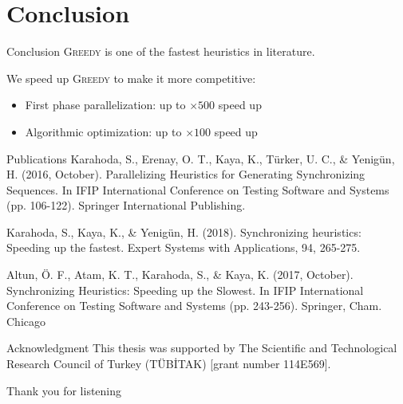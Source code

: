 \documentclass{beamer}
\begin{document}
\section{Conclusion}

\begin{frame}{Conclusion}
\textsc{Greedy} is one of the fastest heuristics in literature.

\medskip

We speed up \textsc{Greedy} to make it more competitive:

\begin{itemize}
	\item First phase parallelization: up to $\times 500$ speed up
	\item Algorithmic optimization: up to $\times 100$ speed up
\end{itemize}

\end{frame}

\begin{frame}{Publications}
\small
Karahoda, S., Erenay, O. T., Kaya, K., T\"{u}rker, U. C., \& Yenig\"{u}n, H. (2016, October). Parallelizing Heuristics for Generating Synchronizing Sequences. In IFIP International Conference on Testing Software and Systems (pp. 106-122). Springer International Publishing.

\medskip

Karahoda, S., Kaya, K., \& Yenig\"{u}n, H. (2018). Synchronizing heuristics: Speeding up the fastest. Expert Systems with Applications, 94, 265-275.

\medskip

Altun, \"{O}. F., Atam, K. T., Karahoda, S., \& Kaya, K. (2017, October). Synchronizing Heuristics: Speeding up the Slowest. In IFIP International Conference on Testing Software and Systems (pp. 243-256). Springer, Cham.
Chicago	

\end{frame}

\begin{frame}{Acknowledgment}
This thesis was supported by The Scientific and Technological Research Council of Turkey (T\"{U}B\.{I}TAK) [grant number 114E569]. 
\end{frame}

\begin{frame}{}
\Huge
\center
Thank you for listening
\end{frame}
\end{document}
